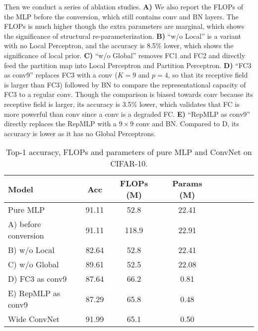 \documentclass[10pt,twocolumn,letterpaper]{article}
\begin{document}
Then we conduct a series of ablation studies. \textbf{A)} We also report the FLOPs of the MLP before the conversion, which still contains conv and BN layers. The FLOPs is much higher though the extra parameters are marginal, which shows the significance of structural re-parameterization. \textbf{B)} ``w/o Local'' is a variant with no Local Perceptron, and the accuracy is 8.5\% lower, which shows the significance of local prior. \textbf{C)} ``w/o Global'' removes FC1 and FC2 and directly feed the partition map into Local Perceptron and Partition Perceptron. \textbf{D)} ``FC3 as conv9'' replaces FC3 with a conv ($K=9$ and $p=4$, so that its receptive field is larger than FC3) followed by BN to compare the representational capacity of FC3 to a regular conv. Though the comparison is biased towards conv because its receptive field is larger, its accuracy is 3.5\% lower, which validates that FC is more powerful than conv since a conv is a degraded FC. \textbf{E)} ``RepMLP as conv9'' directly replaces the RepMLP with a $9\times9$ conv and BN. Compared to D, its accuracy is lower as it has no Global Perceptrons. 

\setlength{\tabcolsep}{4pt}
\begin{table}
	\caption{Top-1 accuracy, FLOPs and parameters of pure MLP and ConvNet on CIFAR-10. }
	\label{table-puremlp}
	\vspace{-0.2in}
	\begin{center}
		\small
		\begin{tabular}{lcccccccc}
			\hline
			Model					&	Acc		&	 FLOPs (M)	&	Params (M) 	\\
			\hline
			Pure MLP				&	91.11	&	52.8		&	22.41	\\
			A) before conversion	&	91.11	&	118.9		&	22.91	\\	
			B) w/o Local			&	82.64	&	52.8		&	22.41	\\	
			C) w/o Global			&	89.61	&	52.5		&	22.08	\\
			D) FC3 as conv9			&	87.64	&	66.2		&	0.81		\\
			E) RepMLP as conv9		&	87.29	&	65.8		&	0.48		\\
			\hline			
			Wide ConvNet	&	91.99	&	65.1		&	0.50		\\
			\hline
		\end{tabular}
	\end{center}
	\vspace{-0.2in}
\end{table}
\setlength{\tabcolsep}{1.4pt}
\end{document}
